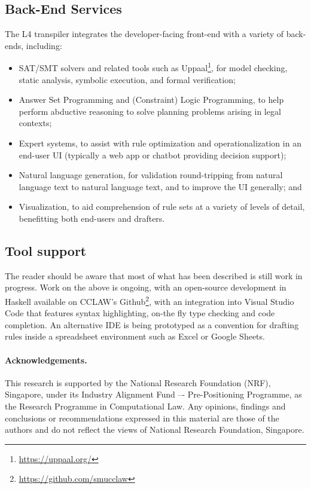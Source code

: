 \documentclass[runningheads]{llncs}
\begin{document}
\subsection{Back-End Services}\label{sec:services}

The L4 transpiler integrates the developer-facing front-end with a variety of back-ends, including:
\begin{itemize}
\item SAT/SMT solvers and related tools such as Uppaal\footnote{\url{https://uppaal.org/}}, for model checking, static analysis, symbolic execution, and formal verification;
\item Answer Set Programming and (Constraint) Logic Programming, to help perform abductive reasoning to solve planning problems arising in legal contexts;
\item Expert systems, to assist with rule optimization and operationalization in an end-user UI (typically a web app or chatbot providing decision support);
\item Natural language generation, for validation round-tripping from natural language text to natural language text, and to improve the UI generally; and
\item Visualization, to aid comprehension of rule sets at a variety of levels of detail, benefitting both end-users and drafters.
\end{itemize}

\subsection{Tool support}\label{sec:tool_support}

The reader should be aware that most of what has been described is still work
in progress. Work on the above is ongoing, with an open-source development in
Haskell available on CCLAW's Github\footnote{\url{https://github.com/smucclaw}}, with an integration into
Visual Studio Code that features syntax highlighting, on-the fly type checking
and code completion. An alternative IDE is being prototyped as a convention for
drafting rules inside a spreadsheet environment such as Excel or Google Sheets.

\paragraph{Acknowledgements.}
This research is supported by the National Research Foundation (NRF),
Singapore, under its Industry Alignment Fund –- Pre-Positioning Programme, as
the Research Programme in Computational Law. Any opinions, findings and
conclusions or recommendations expressed in this material are those of the
authors and do not reflect the views of National Research Foundation,
Singapore.

% 
% 


\end{document}
